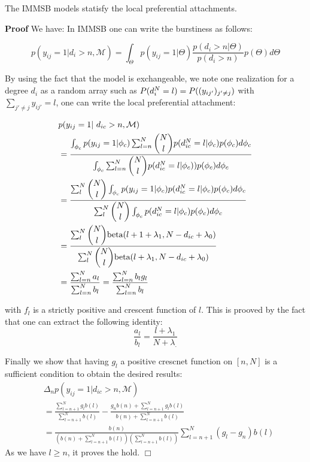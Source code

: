 \begin{proposition}
	The IMMSB models statisfy the local preferential attachments.
\end{proposition}

\noindent \textbf{Proof} We have:
In IMMSB one can write the burstiness as follows:

\begin{equation} 
p(y_{ij} = 1 | d_i>n, \mathcal{M}) = \int_{\Theta} p(y_{ij}=1|\Theta) \frac{p(d_i>n | \Theta)}{p(d_i>n)} p(\Theta) d\Theta \nonumber
\end{equation}

By using the fact that the model is exchangeable, we note one realization for a degree $d_i$ as a random array such as $P(d_i^N=l) = P((y_{ij'})_{j'\neq j})$ with $\sum_{j'\neq j}y_{ij'} = l$, one can write the local preferential attachment:

\begin{align} \label{eq:sum}
&p(y_{ij} = 1 | d_{ic}>n, \mathcal{M}) \nonumber \\
&=  \frac{ \int_{\phi_{c}} p(y_{ij}=1|\phi_{c})\sum_{l=n}^N\dbinom{N}{l} p(d_{ic}^N=l | \phi_{c}) p(\phi_{c}) d\phi_{c}}{\int_{\phi_{c}}\sum_{l=n}^N \dbinom{N}{l}p(d_{ic}^N=l | \phi_{c}))       p(\phi_{c}) d\phi_{c}}  \nonumber \\
&= \frac{\sum_l^N\dbinom{N}{l} \int_{\phi_{c}} p(y_{ij}=1|\phi_{c}) p(d_{ic}^N=l | \phi_{c}) p(\phi_{c}) d\phi_{c} }{\sum_l^N \dbinom{N}{l}\int_{\phi_{c}} p(d_{ic}^N=l | \phi_{c}) p(\phi_{c}) d\phi_{c} } \nonumber\\
&= \frac{\sum_l^N\dbinom{N}{l} \text{beta}(l+1+\lambda_1, N-d_{ic}+\lambda_0) }{\sum_l^N \dbinom{N}{l}\text{beta}(l+\lambda_1, N-d_{ic}+\lambda_0) } \nonumber\\
&=  \frac{\sum_{l=n}^N a_l}{\sum_{l=n}^N b_l}= \frac{\sum_{l=n}^N b_l g_l}{\sum_{l=n}^N b_l} \nonumber
\end{align}

with $f_l$ is a strictly positive and crescent function of $l$. This is prooved by the fact that one can extract the following identity:
\begin{equation}
\frac{a_l}{b_l} = \frac{l+\lambda_1}{N+\lambda_.} \nonumber
\end{equation}

Finally we show that having $g_l$ a positive crescnet function on $[n, N]$ is a sufficient condition to obtain the desired results:
\begin{align}
&\Delta_n p(y_{ij} = 1 | d_{ic}>n, \mathcal{M}) \nonumber \\
&= \frac{\sum_{l=n+1}^N g_l b(l)}{\sum_{l=n+1}^N b(l)} - \frac{g_n b(n) + \sum_{l=n+1}^N g_l b(l)}{b(n) + \sum_{l=n+1}^N b(l)} \nonumber\\
&= \frac{b(n)}{\left(b(n) + \sum_{l=n+1}^N b(l)\right) \left(\sum_{l=n+1}^N b(l)\right)} \sum_{l=n+1}^N (g_l-g_n)b(l) \nonumber
\end{align}
As we have $l \geq n$, it proves the hold. \hfill$\Box$ \\

